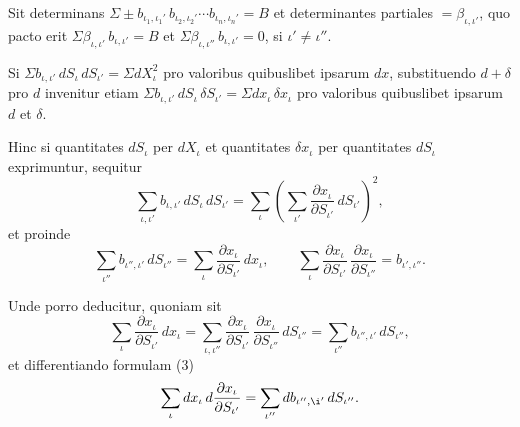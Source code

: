 \documentclass[12pt,a4paper]{article}
\begin{document}
Sit determinans $\Sigma \pm b_{\iota_1,\iota_1'}\, b_{\iota_2,\iota_2'} \cdots b_{\iota_n,\iota_n'} = B$
et determinantes partiales $= \beta_{\iota,\iota'}$, quo pacto erit
$\Sigma \beta_{\iota,\iota'}\, b_{\iota,\iota'} = B$ et
$\Sigma \beta_{\iota,\iota''}\, b_{\iota,\iota'} = 0$, si $\iota' \neq \iota''$.

Si $\Sigma b_{\iota,\iota'}\, dS_{\iota}\, dS_{\iota'} = \Sigma dX_{\iota}^2$ pro valoribus
 quibuslibet ipsarum $dx$, substituendo $d + \delta$ pro $d$ invenitur etiam
$\Sigma b_{\iota,\iota'}\, dS_{\iota}\, \delta S_{\iota'} = \Sigma dx_{\iota}\, \delta x_{\iota}$
 pro valoribus quibuslibet ipsarum $d$ et $\delta$.

Hinc si quantitates $dS_{\iota}$ per $dX_{\iota}$ et quantitates $\delta x_{\iota}$ per
 quantitates $dS_{\iota}$ exprimuntur, sequitur
\[
\sum_{\iota,\iota'} b_{\iota,\iota'}\, dS_{\iota}\, dS_{\iota'} =
\sum_{\iota} \left( \sum_{\iota'} \frac{\partial x_{\iota}}{\partial S_{\iota'}}\, dS_{\iota'} \right)^2,
\]
et proinde
\[
\sum_{\iota''} b_{\iota'',\iota'}\, dS_{\iota''} =
\sum_{\iota} \frac{\partial x_{\iota}}{\partial S_{\iota'}}\, dx_{\iota},
\qquad
\sum_{\iota} \frac{\partial x_{\iota}}{\partial S_{\iota'}}\,
\frac{\partial x_{\iota}}{\partial S_{\iota''}} = b_{\iota',\iota''}.
\]

Unde porro deducitur, quoniam sit
\[
\sum_{\iota} \frac{\partial x_{\iota}}{\partial S_{\iota'}}\,
 dx_{\iota} = \sum_{\iota,\iota''} \frac{\partial x_{\iota}}{\partial S_{\iota'}}\,
\frac{\partial x_{\iota}}{\partial S_{\iota''}}\, dS_{\iota''}
= \sum_{\iota''} b_{\iota'',\iota'}\, dS_{\iota''},
\]
et differentiando formulam (3)
\[
\sum_{\iota} dx_{\iota}\, d\frac{\partial x_{\iota}}{\partial S_{\iota'}} =
\sum_{\iota''} db_{\iota'',\i'}\, dS_{\iota''}.
\]
\end{document}
